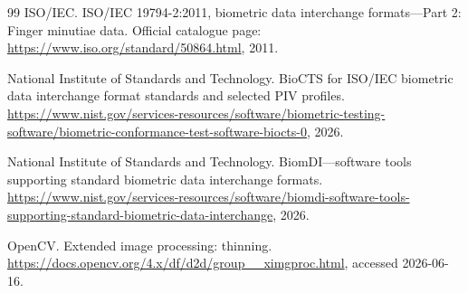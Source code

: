 \documentclass[11pt]{article}
\begin{document}
\begin{thebibliography}{99}
ISO/IEC.
\newblock ISO/IEC 19794-2:2011, biometric data interchange formats---Part 2: Finger minutiae data.
\newblock Official catalogue page: \url{https://www.iso.org/standard/50864.html}, 2011.

National Institute of Standards and Technology.
\newblock BioCTS for ISO/IEC biometric data interchange format standards and selected PIV profiles.
\newblock \url{https://www.nist.gov/services-resources/software/biometric-testing-software/biometric-conformance-test-software-biocts-0}, 2026.

National Institute of Standards and Technology.
\newblock BiomDI---software tools supporting standard biometric data interchange formats.
\newblock \url{https://www.nist.gov/services-resources/software/biomdi-software-tools-supporting-standard-biometric-data-interchange}, 2026.

OpenCV.
\newblock Extended image processing: thinning.
\newblock \url{https://docs.opencv.org/4.x/df/d2d/group__ximgproc.html}, accessed 2026-06-16.

\end{thebibliography}
\end{document}

